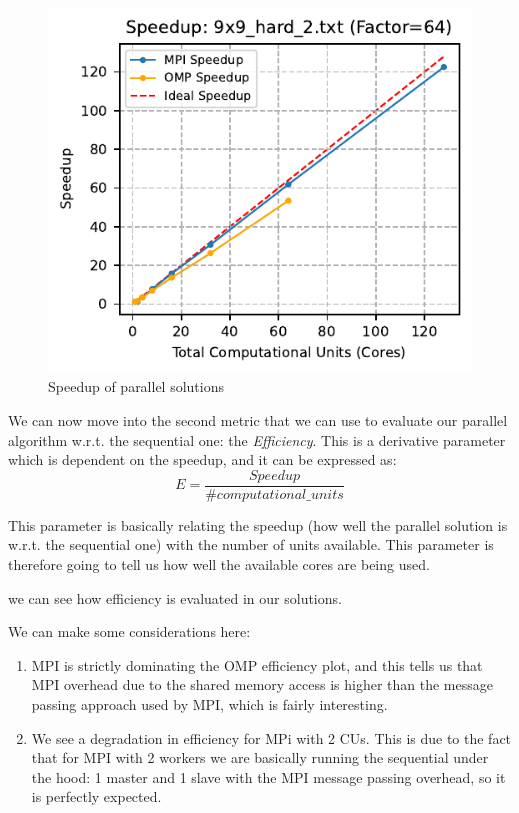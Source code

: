 \begin{figure}[htbp]
\centering
\includegraphics[width=0.9\linewidth]{imgs/speedup_mpi_omp_9x9_hard_2.pdf}
\caption{Speedup of parallel solutions}
\label{fig:speedup_9x9}
\end{figure}

We can now move into the second metric that we can use to evaluate our parallel algorithm w.r.t. the sequential one: the \textit{Efficiency}. This is a derivative parameter which is dependent on the speedup, and it can be expressed as:
\[
E = \frac{Speedup}{\# computational\_units}
\]

This parameter is basically relating the speedup (how well the parallel solution is w.r.t. the sequential one) with the number of units available. This parameter is therefore going to tell us how well the available cores are being used.

 we can see how efficiency is evaluated in our solutions. 

We can make some considerations here:
\begin{enumerate}
    \item MPI is strictly dominating the OMP efficiency plot, and this tells us that MPI overhead due to the shared memory access is higher than the message passing approach used by MPI, which is fairly interesting.
    \item We see a degradation in efficiency for MPi with 2 CUs. This is due to the fact that for MPI with 2 workers we are basically running the sequential under the hood: 1 master and 1 slave with the MPI message passing overhead, so it is perfectly expected.
\end{enumerate}

